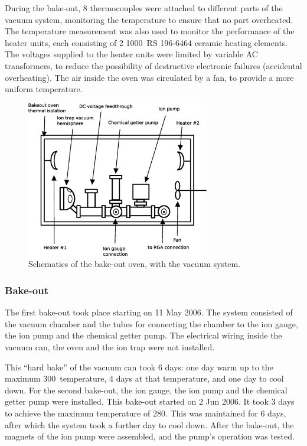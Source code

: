 During the bake-out, 8 thermocouples were attached to different parts of the vacuum system, monitoring the temperature to ensure that no part overheated. The temperature measurement was also used to monitor the performance of the heater units, each consisting of  2 1000\W\, RS 196-6464 ceramic heating elements. The voltages supplied to the heater units were limited by variable AC transformers, to reduce the possibility of destructive electronic failures (accidental overheating). The air inside the oven was circulated by a fan, to provide a more uniform temperature.

\begin{figure}[t]
\centering
\includegraphics[width=8cm]{chapter5/bakeout/bakeout}
\caption[Schematics of the bake-out oven]{Schematics of the bake-out oven, with the vacuum system.}
\label{bakeout_oven}
\end{figure} 

\subsubsection{Bake-out} 

The first bake-out took place starting on 11 May 2006. The system consisted of the vacuum chamber and the tubes for connecting the chamber to the ion gauge, the ion pump and the chemical getter pump. The electrical wiring inside the vacuum can, the \CaI{} oven and the ion trap were not installed.

This ``hard bake'' of the vacuum can took 6 days: one day warm up to the maximum 300\degC\, temperature, 4 days at that temperature, and one day to cool down. For the second bake-out, the ion gauge, the ion pump and the chemical getter pump were installed. This bake-out started on 2 Jun 2006. It took 3 days to achieve the maximum temperature of 280\degC. This was maintained for 6 days, after which the system took a further day to cool down. After the bake-out, the magnets of the ion pump were assembled, and the pump's operation was tested.

